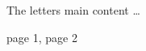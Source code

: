 \documentclass[]{rabrief}
\begin{document}
\begin{letter}
The letters main content \ldots

\end{letter}

\enlargethispage{3.5cm}
\begin{attachment}
page 1, page 2
\end{attachment}
\end{document}
